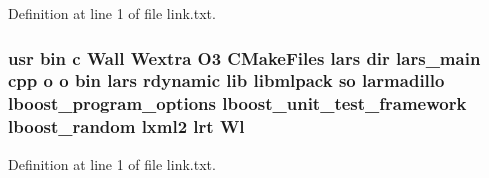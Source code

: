 Definition at line 1 of file link.\-txt.

\subsubsection[{Wl}]{\setlength{\rightskip}{0pt plus 5cm}usr bin c Wall Wextra O3 C\-Make\-Files lars dir lars\-\_\-main cpp o o bin lars rdynamic lib libmlpack so larmadillo lboost\-\_\-program\-\_\-options lboost\-\_\-unit\-\_\-test\-\_\-framework lboost\-\_\-random lxml2 lrt Wl}\label{methods_2lars_2CMakeFiles_2lars_8dir_2link_8txt_a98bb5d4b39ff9beeac83812c3d7e6201}


Definition at line 1 of file link.\-txt.

